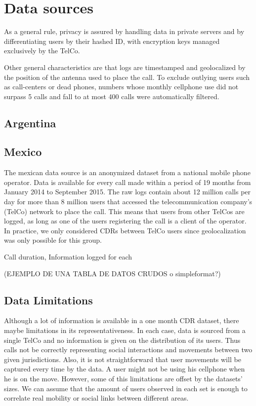 \section{Data sources}

As a general rule, privacy is assured by handling data in private servers and by differentiating users by their hashed ID, with encryption keys managed exclusively by the TelCo.

Other general characteristics are that logs are timestamped and geolocalized by the position of the antenna used to place the call. To exclude outlying users such as call-centers or dead phones, numbers whose monthly cellphone use did not surpass 5 calls and fall to at most 400 calls were automatically filtered.

\subsection{Argentina}

\subsection{Mexico}

The mexican data source is an anonymized dataset from a national mobile phone operator. Data is available for every call made within a period of 19 months from January 2014 to September 2015. The raw logs contain about 12 million calls per day for more than 8 million users that accessed the telecommunication company's (TelCo) network to place the call. This means that users from other TelCos are logged, as long as one of the users registering the call is a client of the operator. In practice, we only considered CDRs between TelCo users since geolocalization was only possible for this group.

Call duration, Information logged for each

(EJEMPLO DE UNA TABLA DE DATOS CRUDOS o simpleformat?)

\subsection{Data Limitations}

Although a lot of information is available in a one month CDR dataset, there maybe limitations in its representativeness. In each case, data is sourced from a single TelCo and no information is given on the distribution of its users. Thus calls not be correctly representing social interactions and movements between two given jurisdictions. Also, it is not straightforward that user movements will be captured every time by the data. A user might not be using his cellphone when he is on the move.
However, some of this limitations are offset by the datasets' sizes. We can assume that the amount of users observed in each set is enough to correlate real mobility or social links between different areas.

